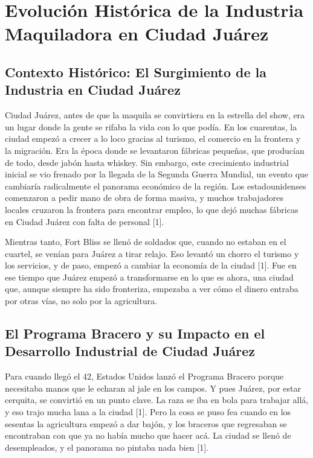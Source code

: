 \maketitle %

\chapter{Evolución Histórica de la Industria Maquiladora en Ciudad Juárez}

\section{Contexto Histórico: El Surgimiento de la Industria en Ciudad Juárez}

Ciudad Juárez, antes de que la maquila se convirtiera en la estrella del show, era un lugar donde la gente se rifaba la vida con lo que podía. En los cuarentas, la ciudad empezó a crecer a lo loco gracias al turismo, el comercio en la frontera y la migración. Era la época donde se levantaron fábricas pequeñas, que producían de todo, desde jabón hasta whiskey. Sin embargo, este crecimiento industrial inicial se vio frenado por la llegada de la Segunda Guerra Mundial, un evento que cambiaría radicalmente el panorama económico de la región. Los estadounidenses comenzaron a pedir mano de obra de forma masiva, y muchos trabajadores locales cruzaron la frontera para encontrar empleo, lo que dejó muchas fábricas en Ciudad Juárez con falta de personal [1].

Mientras tanto, Fort Bliss se llenó de soldados que, cuando no estaban en el cuartel, se venían para Juárez a tirar relajo. Eso levantó un chorro el turismo y los servicios, y de paso, empezó a cambiar la economía de la ciudad [1]. Fue en ese tiempo que Juárez empezó a transformarse en lo que es ahora, una ciudad que, aunque siempre ha sido fronteriza, empezaba a ver cómo el dinero entraba por otras vías, no solo por la agricultura.

\section{El Programa Bracero y su Impacto en el Desarrollo Industrial de Ciudad Juárez}

Para cuando llegó el 42, Estados Unidos lanzó el Programa Bracero porque necesitaba manos que le echaran al jale en los campos. Y pues Juárez, por estar cerquita, se convirtió en un punto clave. La raza se iba en bola para trabajar allá, y eso trajo mucha lana a la ciudad [1]. Pero la cosa se puso fea cuando en los sesentas la agricultura empezó a dar bajón, y los braceros que regresaban se encontraban con que ya no había mucho que hacer acá. La ciudad se llenó de desempleados, y el panorama no pintaba nada bien [1].


